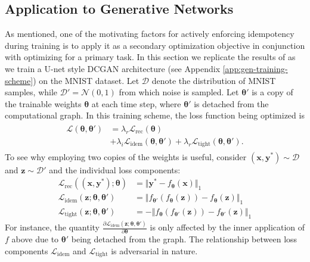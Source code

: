 \documentclass{article}
\theoremstyle{plain}
\theoremstyle{definition}
\theoremstyle{remark}
\newcommand{\vx}{\mathbf{x}}
\newcommand{\vy}{\mathbf{y}}
\newcommand{\vz}{\mathbf{z}}
\newcommand{\vtheta}{\bm{\theta}}
\newcommand{\pd}[2]{\frac{\partial{#1}}{\partial{#2}}}
\begin{document}
\subsection{Application to Generative Networks}
\label{sec:experiment-gen}
As mentioned, one of the motivating factors for actively enforcing idempotency during training is to apply it as a secondary optimization objective in conjunction with optimizing for a primary task. In this section we replicate the results of \citealt{shocher-ign} as we train a U-net style DCGAN architecture (see Appendix \ref{app:gen-training-scheme}) on the MNIST dataset. Let $\mathcal{D}$ denote the distribution of MNIST samples, while ${\mathcal{D}' = \mathcal{N}(0, 1)}$ from which noise is sampled. Let $\vtheta'$ is a copy of the trainable weights $\vtheta$ at each time step, where $\vtheta'$ is detached from the computational graph. In this training scheme, the loss function being optimized is
%
\begin{align}
    \begin{split}
        \mathcal{L}{(\vtheta, \vtheta')} & = \lambda_r \mathcal{L}_{\mathrm{rec}}{(\vtheta)}                                                                           \\
                                         & + \lambda_i \mathcal{L}_{\mathrm{idem}}{(\vtheta, \vtheta')} + \lambda_r \mathcal{L}_{\mathrm{tight}}{(\vtheta, \vtheta')}.
    \end{split}
    \label{eq:gan-loss}
\end{align}
%
To see why employing two copies of the weights is useful, consider $(\vx, \vy^*) \sim \mathcal{D}$ and $\vz \sim \mathcal{D}'$ and the individual loss components:
%
\begin{align}
    \mathcal{L}_{\mathrm{rec}}{((\vx, \vy^*); \vtheta)}    & = \Vert \vy^* - f_{\vtheta}(\vx) \Vert_1                            \\
    \mathcal{L}_{\mathrm{idem}}{(\vz; \vtheta, \vtheta')}  & = \Vert f_{\vtheta'}(f_{\vtheta}(\vz)) - f_{\vtheta}(\vz) \Vert_1   \\
    \mathcal{L}_{\mathrm{tight}}{(\vz; \vtheta, \vtheta')} & = -\Vert f_{\vtheta}(f_{\vtheta'}(\vz)) - f_{\vtheta'}(\vz) \Vert_1
\end{align}
%
For instance, the quantity $\pd{\mathcal{L}_{\mathrm{idem}}{(\vz; \vtheta, \vtheta')}}{\vtheta}$ is only affected by the inner application of $f$ above due to $\vtheta'$ being detached from the graph. The relationship between loss components $\mathcal{L}_{\mathrm{idem}}$ and $\mathcal{L}_{\mathrm{tight}}$ is adversarial in nature.
\end{document}
